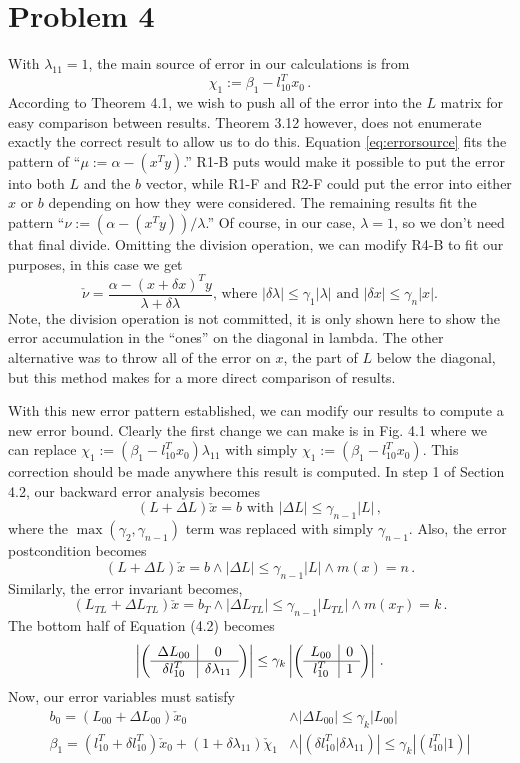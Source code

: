 \documentclass[letterpaper,10pt]{article}
\providecommand{\abs}[1]{\left\lvert#1\right\rvert}
\begin{document}
\section{Problem 4}
With $\lambda_{11}=1$, the main source of error in our calculations is from
\begin{equation}\label{eq:errorsource}
\chi_1:=\beta_1-l_{10}^Tx_0\,.
\end{equation}
According to Theorem 4.1, we wish to push all of the error into the $L$ matrix
for easy comparison between results. Theorem 3.12 however, does not enumerate
exactly the correct result to allow us to do this. Equation
\ref{eq:errorsource} fits the pattern of ``$\mu:=\alpha-(x^Ty)$.'' R1-B puts
would make it possible to put the error into both $L$ and the $b$ vector,
while R1-F and R2-F could put the error into either $x$ or $b$ depending on how
they were considered. The remaining results fit the pattern
``$\nu:=(\alpha-(x^Ty))/\lambda$.''  Of course, in our case, $\lambda=1$, so we
don't need that final divide. Omitting the division operation, we can modify
R4-B to fit our purposes, in this case we get
\[
\check\nu=\frac{\alpha-(x+\delta x)^Ty}{\lambda+\delta\lambda}\text{, where }
\abs{\delta\lambda}\leq\gamma_1\abs{\lambda}
\text{ and }\abs{\delta x}\leq\gamma_n\abs{x}.
\]
Note, the division operation is not committed, it is only shown here to show
the error accumulation in the ``ones'' on the diagonal in lambda. The other
alternative was to throw all of the error on $x$, the part of $L$ below the
diagonal, but this method makes for a more direct comparison of results.

With this new error pattern established, we can modify our results to compute a
new error bound. Clearly the first change we can make is in Fig. 4.1 where we
can replace $\chi_1:=(\beta_1-l_{10}^Tx_0)\lambda_{11}$ with simply
$\chi_1:=(\beta_1-l_{10}^Tx_0)$. This correction should be made anywhere this
result is computed. In step 1 of Section 4.2, our backward error analysis
becomes
\[
(L+\Delta L)\check x=b\text{ with }\abs{\Delta L}\leq\gamma_{n-1}\abs{L}\,,
\]
where the $\max(\gamma_2,\gamma_{n-1})$ term was replaced with simply
$\gamma_{n-1}$. Also, the error postcondition becomes
\[
{(L+\Delta L)\check x=b\wedge\abs{\Delta L}\leq\gamma_{n-1}\abs{L}\wedge m(x)=n}
\,.
\]
Similarly, the error invariant becomes,
\[
{(L_{TL}+\Delta L_{TL})\check x=b_T\wedge\abs{\Delta
L_{TL}}\leq\gamma_{n-1}\abs{L_{TL}}\wedge m(x_T)=k}\,.
\]
The bottom half of Equation (4.2) becomes
\[
\abs{\FlaTwoByTwoSingleLine{\Delta L_{00}}{0}{\delta
l_{10}^T}{\delta\lambda_{11}}}\leq\gamma_{k}
\abs{\FlaTwoByTwoSingleLine{L_{00}}{0}{l_{10}^T}{1}}\,.
\]
Now, our error variables must satisfy
\[
\begin{array}{ll}
b_0=(L_{00}+\Delta L_{00})\check x_0
& \wedge\abs{\Delta L_{00}}\leq\gamma_k\abs{L_{00}} \\
\beta_1=(l_{10}^T+\delta l_{10}^T)\check x_0+(1+\delta\lambda_{11})\check\chi_1
& \wedge\abs{(\delta l_{10}^T|\delta\lambda_{11})}\leq\gamma_k
\abs{(l_{10}^T|1)} \\
\end{array}
\]
\end{document}

